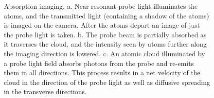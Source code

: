 \documentclass[12pt]{iopart}
\begin{document}
\begin{figure}
\caption{Absorption imaging. a. Near resonant probe light illuminates the atoms, and the transmitted light (containing a shadow of the atoms) is imaged on the camera. After the atoms depart an image of just the probe light is taken. b.  The probe beam is partially absorbed as it traverses the cloud, and the intensity seen by atoms further along the imaging direction \ez{} is lowered.  c. An atomic cloud illuminated by a probe light field absorbs photons from the probe and re-emits them in all directions. This process results in a net velocity of the cloud in the direction of the probe light as well as diffusive spreading in the transverse directions.  }  
\label{fig:absorptionIntor}
\end{figure}
\end{document}
